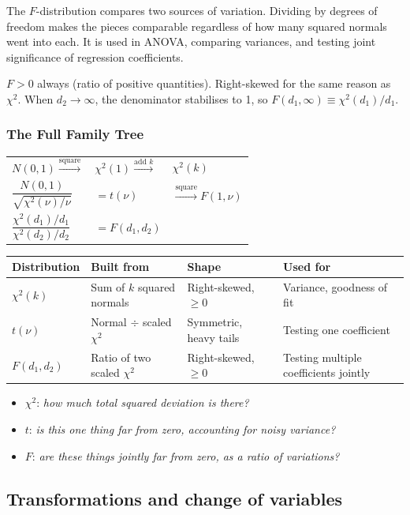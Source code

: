 \begin{remark}[Intuition]
The $F$-distribution compares two sources of variation. Dividing by degrees of freedom makes the pieces comparable regardless of how many squared normals went into each. It is used in ANOVA, comparing variances, and testing joint significance of regression coefficients.
\end{remark}

\begin{remark}[Shape]
$F > 0$ always (ratio of positive quantities). Right-skewed for the same reason as $\chi^2$. When $d_2 \to \infty$, the denominator stabilises to 1, so $F(d_1, \infty) \equiv \chi^2(d_1)/d_1$.
\end{remark}

\subsubsection*{The Full Family Tree}

\begin{center}
\begin{tabular}{lll}
$N(0,1) \xrightarrow{\text{square}}$ & $\chi^2(1) \xrightarrow{\text{add }k}$ & $\chi^2(k)$ \\[4pt]
$\dfrac{N(0,1)}{\sqrt{\chi^2(\nu)/\nu}}$ & $= t(\nu)$ & $\xrightarrow{\text{square}} F(1,\nu)$ \\[8pt]
$\dfrac{\chi^2(d_1)/d_1}{\chi^2(d_2)/d_2}$ & $= F(d_1, d_2)$ &
\end{tabular}
\end{center}

\begin{center}
\begin{tabular}{llll}
\textbf{Distribution} & \textbf{Built from} & \textbf{Shape} & \textbf{Used for} \\
\hline
$\chi^2(k)$ & Sum of $k$ squared normals & Right-skewed, $\geq 0$ & Variance, goodness of fit \\
$t(\nu)$ & Normal $\div$ scaled $\chi^2$ & Symmetric, heavy tails & Testing one coefficient \\
$F(d_1,d_2)$ & Ratio of two scaled $\chi^2$ & Right-skewed, $\geq 0$ & Testing multiple coefficients jointly \\
\end{tabular}
\end{center}

\begin{remark}
\begin{itemize}
    \item $\chi^2$: \emph{how much total squared deviation is there?}
    \item $t$: \emph{is this one thing far from zero, accounting for noisy variance?}
    \item $F$: \emph{are these things jointly far from zero, as a ratio of variations?}
\end{itemize}
\end{remark}

\subsection{Transformations and change of variables}

